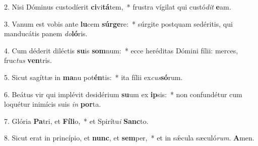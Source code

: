 2. Nisi Dóminus custodíerit \textbf{ci}vi\textbf{tá}tem,~*  frustra vígilat qui custó\textit{dit} \textbf{e}am.\

3. Vanum est vobis ante \textbf{lu}cem \textbf{súr}\textbf{ge}re:~*  súrgite postquam sedéritis, qui manducátis panem \textit{do}\textbf{ló}ris.\

4. Cum déderit diléctis \textbf{su}is \textbf{som}num:~*  ecce heréditas Dómini fílii: merces, fruc\textit{tus} \textbf{ven}tris.\

5. Sicut sagíttæ in \textbf{ma}nu pot\textbf{én}tis:~*  ita fílii ex\textit{cus}\textbf{só}rum.\

6. Beátus vir qui implévit desidérium \textbf{su}um ex \textbf{ip}sis:~*  non confundétur cum loquétur inimícis suis \textit{in} \textbf{por}ta.\

7. Glória \textbf{Pa}tri, et \textbf{Fí}\textbf{li}o,~*  et Spirítu\textit{i} \textbf{Sanc}to.\

8. Sicut erat in princípio, et \textbf{nunc}, et \textbf{sem}per,~*  et in sǽcula sæculó\textit{rum}. \textbf{A}men.\

